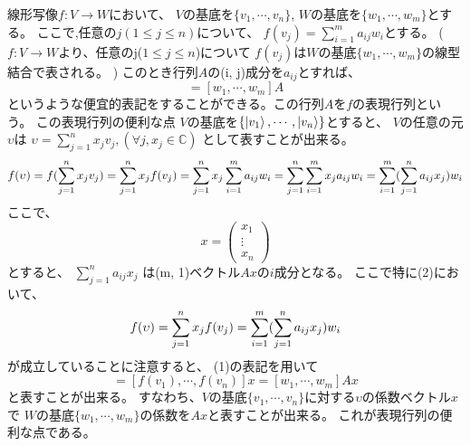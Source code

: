 \color{red}{\large 復習:(表現行列の定義)}
\setcounter{equation}{0}
線形写像$f:V \to W$において、
$V$の基底を$\{v_1, \cdots, v_n\}$, $W$の基底を$\{w_1,\cdots, w_m\}$とする。
\newline
ここで,任意の$j (1\leq j\leq n)$について、
$f(v_j) = \sum_{i=1}^m a_{ij}w_i$とする。
\newline
($f:V \to W$より、任意のj($1\leq j\leq n$)について
$f(v_j)$は$W$の基底$\{w_1, \cdots, w_m\}$の線型結合で表される。
)
\newline
このとき行列$A$の(i, j)成分を$a_{ij}$とすれば、 
\begin{equation}
[f(v_1), \cdots, f(v_n)] = [w_1, \cdots, w_m]A
\end{equation}
というような便宜的表記をすることができる。この行列$A$を$f$の表現行列という。
\newline
 この表現行列の便利な点
\newline
$V$の基底を$\{\ket{v_1},\cdots, \ket{v_n}\}$とすると、 
$V$の任意の元$\upsilon$は
$\upsilon = \sum_{j=1}^n x_j v_j, (\forall j, x_j \in \mathbb{C})$
として表すことが出来る。
\newline
\begin{equation}
f(\upsilon) \newline
=f(\sum_{j=1}^n x_j v_j) \\ 
=\sum_{j=1}^n x_j f(v_j) \\
=\sum_{j=1}^n x_j \sum_{i=1}^m a_{ij}w_i \\
=\sum_{j=1}^n \sum_{i=1}^m x_j a_{ij}w_i \\
=\sum_{i=1}^m (\sum_{j=1}^n a_{ij} x_j)w_i
\end{equation}
ここで、
\[x = \left(
	\begin{array}{c}
	x_1 \\
	\vdots \\
	x_n
	\end{array}
	\right)
\]
とすると、
$\sum_{j=1}^n a_{ij} x_j$
は(m, 1)ベクトル$Ax$の$i$成分となる。
\newline
ここで特に(2)において、
\begin{equation}
f(\upsilon)
=\sum_{j=1}^n x_j f(v_j) \\
=\sum_{i=1}^m (\sum_{j=1}^n a_{ij} x_j)w_i
\end{equation}
が成立していることに注意すると、
(1)の表記を用いて
\begin{equation}
[f(\upsilon)]=[f(v_1), \cdots, f(v_n)]x
 = [w_1, \cdots, w_m]Ax
\end{equation}
と表すことが出来る。
すなわち、$V$の基底$\{v_1,\cdots, v_n\}$に対する$\upsilon$の係数ベクトル$x$
で $W$の基底$\{w_1,\cdots, w_m\}$の係数を$Ax$と表すことが出来る。
これが表現行列の便利な点である。
